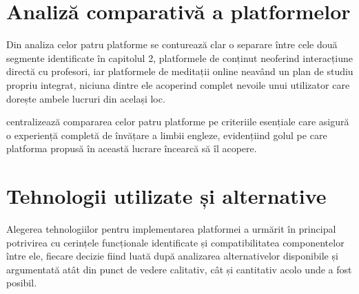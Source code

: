 \section{Analiză comparativă a platformelor}

Din analiza celor patru platforme se conturează clar o separare între cele două segmente identificate în capitolul 2, platformele de conținut neoferind interacțiune directă cu profesori, iar platformele de meditații online neavând un plan de studiu propriu integrat, niciuna dintre ele acoperind complet nevoile unui utilizator care dorește ambele lucruri din același loc.

 centralizează compararea celor patru platforme pe criteriile esențiale care asigură o experiență completă de învățare a limbii engleze, evidențiind golul pe care platforma propusă în această lucrare încearcă să îl acopere.

\begin{table}[htbp]
    \centering
    \caption{Analiza comparativă a platformelor educaționale existente}
    \label{tab:platform-comparison}
\end{table}

\section{Tehnologii utilizate și alternative}
Alegerea tehnologiilor pentru implementarea platformei a urmărit în principal potrivirea cu cerințele funcționale identificate și compatibilitatea componentelor între ele, fiecare decizie fiind luată după analizarea alternativelor disponibile și argumentată atât din punct de vedere calitativ, cât și cantitativ acolo unde a fost posibil.

